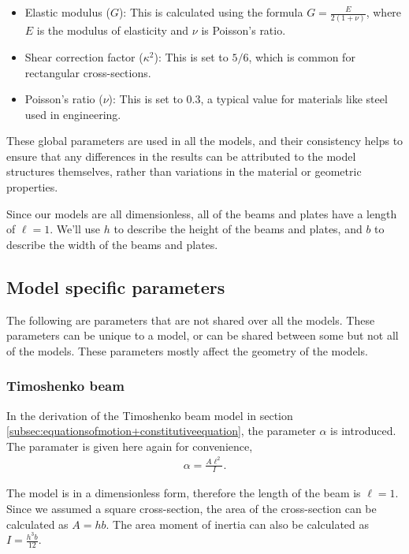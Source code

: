 \documentclass[../../main.tex]{subfiles}
\begin{document}
\begin{itemize}
  \item Elastic modulus ($G$): This is calculated using the formula $G = \frac{E}{2(1+\nu)}$, where $E$ is the modulus of elasticity and $\nu$ is Poisson's ratio. 

  \item Shear correction factor ($\kappa^2$): This is set to $5/6$, which is common for rectangular cross-sections.

  \item Poisson's ratio ($\nu$): This is set to $0.3$, a typical value for materials like steel used in engineering.
\end{itemize}

These global parameters are used in all the models, and their consistency helps to ensure that any differences in the results can be attributed to the model structures themselves, rather than variations in the material or geometric properties.

Since our models are all dimensionless, all of the beams and plates have a length of $\ell = 1$. We'll use $h$ to describe the height of the beams and plates, and $b$ to describe the width of the beams and plates.

\subsection{Model specific parameters}
The following are parameters that are not shared over all the models. These parameters can be unique to a model, or can be shared between some but not all of the models. These parameters mostly affect the geometry of the models.

\subsubsection{Timoshenko beam}
In the derivation of the Timoshenko beam model in section \ref{subsec:equationsofmotion+constitutiveequation}, the parameter $\alpha$ is 
introduced. The paramater is given here again for convenience,
\begin{eqnarray*}
	\alpha = \frac{A\ell^2}{I}.
\end{eqnarray*}

The model is in a dimensionless form, therefore the length of the beam is $\ell = 1$. Since we assumed a square cross-section, the area of the cross-section can be calculated as $\displaystyle A = hb$. The area moment of inertia can also be calculated as $\displaystyle I = \frac{h^3b}{12}$.
\end{document}
